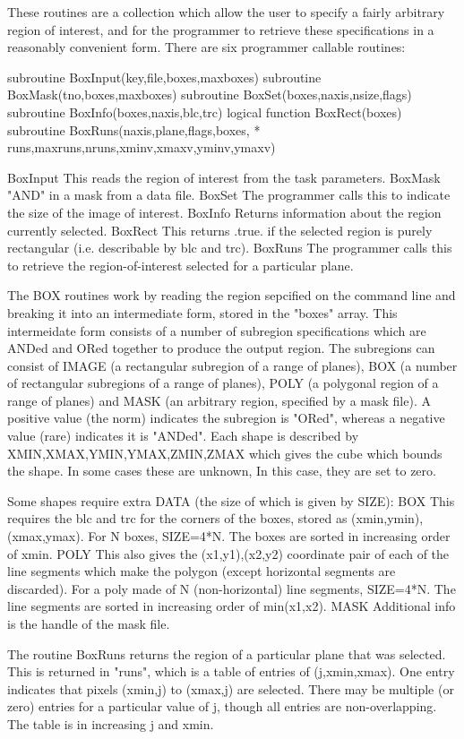 \par{\tenpoint
{\eightpoint\begintt
  These routines are a collection which allow the user to specify a
  fairly arbitrary region of interest, and for the programmer to retrieve
  these specifications in a reasonably convenient form. There are six
  programmer callable routines:

       subroutine BoxInput(key,file,boxes,maxboxes)
       subroutine BoxMask(tno,boxes,maxboxes)
       subroutine BoxSet(boxes,naxis,nsize,flags)
       subroutine BoxInfo(boxes,naxis,blc,trc)
       logical function BoxRect(boxes)
       subroutine BoxRuns(naxis,plane,flags,boxes,
    *                  runs,maxruns,nruns,xminv,xmaxv,yminv,ymaxv)

  BoxInput     This reads the region of interest from the task parameters.
  BoxMask      "AND" in a mask from a data file.
  BoxSet       The programmer calls this to indicate the size of the
               image of interest.
  BoxInfo      Returns information about the region currently selected.
  BoxRect      This returns .true. if the selected region is purely
               rectangular (i.e. describable by blc and trc).
  BoxRuns      The programmer calls this to retrieve the region-of-interest
               selected for a particular plane.

  The BOX routines work by reading the region sepcified on the command line
  and breaking it into an intermediate form, stored in the "boxes" array.
  This intermeidate form consists of a number of subregion specifications
  which are ANDed and ORed together to produce the output region. The
  subregions can consist of IMAGE (a rectangular subregion of a range of
  planes), BOX (a number of rectangular subregions of a range of planes),
  POLY (a polygonal region of a range of planes) and MASK (an arbitrary
  region, specified by a mask file). A positive value (the norm) indicates
  the subregion is "ORed", whereas a negative value (rare) indicates it
  is "ANDed". Each shape is described by XMIN,XMAX,YMIN,YMAX,ZMIN,ZMAX
  which gives the cube which bounds the shape. In some cases these are
  unknown, In this case, they are set to zero.

  Some shapes require extra DATA (the size of which is given by SIZE):
    BOX  This requires the blc and trc for the corners of the boxes,
         stored as (xmin,ymin),(xmax,ymax). For N boxes, SIZE=4*N.
         The boxes are sorted in increasing order of xmin.
    POLY This also gives the (x1,y1),(x2,y2) coordinate pair of each of
         the line segments which make the polygon (except horizontal segments
         are discarded). For a poly made of N (non-horizontal) line segments,
         SIZE=4*N. The line segments are sorted in increasing order of
         min(x1,x2).
    MASK Additional info is the handle of the mask file.

  The routine BoxRuns returns the region of a particular plane that was
  selected. This is returned in "runs", which is a table of entries of
  (j,xmin,xmax). One entry indicates that
  pixels (xmin,j) to (xmax,j) are selected. There may be multiple (or
  zero) entries for a particular value of j, though all entries are
  non-overlapping. The table is in increasing j and xmin.
\endtt}
\par}
